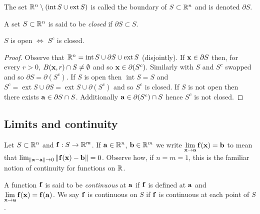\begin{definition}[boundary]
    The set \(\bR^n \setminus (\operatorname{int} S \cup \operatorname{ext} S )\) is called the boundary of \(S \subset \bR^n\) and is denoted \(\partial S\).
\end{definition}


\begin{definition}[closed]
    A set \(S\subset \bR^n\) is said to be \emph{closed} if \(\partial S \subset S\).
\end{definition}

\begin{lemma}
    \(S\) is open \(\Longleftrightarrow \) \(S^c\) is closed.
\end{lemma}
\begin{proof}
    Observe that \(\bR^n =  \operatorname{int} S \cup \partial S \cup \operatorname{ext} S\) (disjointly).
    If \(\xx \in \partial S\) then, for every \(r>0\), \(B(\xx,r) \cap S \neq \emptyset\) and so \(\xx \in \partial(S^c)\).
    Similarly with \(S\) and \(S^c\) swapped and so \(\partial S = \partial(S^c)\).
    If \(S\) is open then \(\operatorname{int} S = S\) and \(S^c = \operatorname{ext} S \cup \partial S =  \operatorname{ext} S \cup \partial (S^c)\) and so \(S^c\) is closed.
    If \(S\) is not open then there exists \(\aa \in \partial S \cap S\). Additionally  \(\aa \in \partial (S^c) \cap S\) hence \(S^c\) is not closed.
\end{proof}


\subsection*{Limits and continuity}

Let \(S\subset \bR^n\) and \(\ff : S \to \bR^m\).
If \(\aa\in \bR^n\), \(\bb\in \bR^m\) we write
    {\(  \displaystyle\lim_{\xx \to \aa}\ff(\xx) = \bb \)}
to mean that
\(\lim_{\norm{\xx-\aa}\to 0}\norm{\ff(\xx)-\bb}=0\).
Observe how, if \(n=m=1\), this is the familiar notion of continuity for functions on \(\bR\).

\begin{definition}[continuous]
    A function \(\ff\) is said to be \emph{continuous} at \(\aa\) if \(\ff\) is defined at \(\aa\) and
    \(  \displaystyle\lim_{\xx \to \aa}\ff(\xx) = \ff(\aa)\).
    We say \(\ff\) is continuous on \(S\) if \(\ff\) is continuous at each point of \(S\).
\end{definition}

